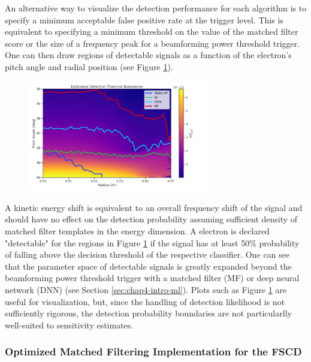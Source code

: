 An alternative way to visualize the detection performance for each algorithm is to specify a minimum acceptable false positive rate at the trigger level. This is equivalent to specifying a minimum threshold on the value of the matched filter score or the size of a frequency peak for a beamforming power threshold trigger. One can then draw regions of detectable signals as a function of the electron's pitch angle and radial position (see Figure \ref{fig:chap4-estimated-detection-threshold-parameter-space}).
\begin{figure}[htbp]
    \centering
    \includegraphics*[width=0.7\textwidth]{figs/Chapter-4/220318_static_vs_bf_vs_mf_vs_dnn_detection_threshold_electron_paramter_map.png}
    \caption{\label{fig:chap4-estimated-detection-threshold-parameter-space}}
\end{figure}
A kinetic energy shift is equivalent to an overall frequency shift of the signal and should have no effect on the detection probability assuming sufficient density of matched filter templates in the energy dimension. A electron is declared "detectable" for the regions in Figure \ref{fig:chap4-estimated-detection-threshold-parameter-space} if the signal has at least 50\% probability of falling above the decision threshold of the respective classifier. One can see that the parameter space of detectable signals is greatly expanded beyond the beamforming power threshold trigger with a matched filter (MF) or deep neural network (DNN) (see Section \ref{sec:chap4-intro-ml}). Plots such as Figure \ref{fig:chap4-estimated-detection-threshold-parameter-space} are useful for visualization, but, since the handling of detection likelihood is not sufficiently rigorous, the detection probability boundaries are not particularlly well-suited to sensitivity estimates.

\subsubsection*{Optimized Matched Filtering Implementation for the FSCD}

